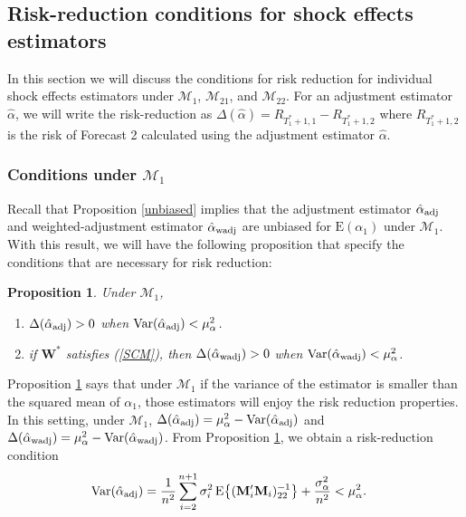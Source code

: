 \documentclass[11pt,3p,review,authoryear]{elsarticle}
\def\mbf#1{\mathbf{#1}} %
\def\mrm#1{\mathrm{#1}} %
\def\mc#1{\mathcal{#1}} %
\def\E#1{\mathrm{E}(#1)} %
\def\var#1{\mathrm{Var}(#1)} %
\DeclareMathOperator{\Var}{Var} %
\newtheorem{prop}{Proposition}
\theoremstyle{definition}
\begin{document}
\subsection{Risk-reduction conditions for shock effects estimators}
\label{conditions}

In this section we will discuss the conditions for risk reduction for individual shock effects estimators under $\mc{M}_1$, $\mc{M}_{21}$, and $\mc{M}_{22}$. For an adjustment estimator $\hat{\alpha}$, we will write the risk-reduction as $\Delta(\hat{\alpha})=R_{T_1^*+1,1}-R_{T_1^*+1,2}$ where $R_{T_1^*+1,2}$ is the risk of Forecast 2 calculated using the adjustment estimator $\hat{\alpha}$.

\subsubsection{Conditions under $\mc{M}_1$}
 \label{conditionsmodel1}
 
Recall that Proposition \ref{unbiased} implies that the adjustment estimator $\hat{\alpha}_{\rm adj}$ and weighted-adjustment estimator $\hat{\alpha}_{\rm wadj}$ are unbiased for $\E{\alpha_1}$ under $\mc{M}_1$. With this result, we will have  the following proposition that specify the conditions that are necessary for risk reduction:  

\begin{prop}
\label{proprisk}Under $\mc{M}_1$,
\begin{enumerate}[label = (\roman*)]
  \item $\Delta(\hat\alpha_{\rm adj}) > 0$  when 
$\Var(\hat{\alpha}_{\rm adj}) < \mu_{\alpha}^2$.
  \item if $\mbf{W}^*$ satisfies (\ref{SCM}), then $\Delta(\hat\alpha_{\rm wadj}) > 0$ when $\var{\hat{\alpha}_{\rm wadj}}<\mu_{\alpha}^2$. 
\end{enumerate}
\end{prop}


Proposition \ref{proprisk} says that under $\mc{M}_1$ if the variance of the estimator is smaller than the squared mean of $\alpha_1$, those estimators will enjoy the risk reduction properties.   In this setting, under $\mc{M}_1$, $\Delta(\hat{\alpha}_{\rm adj})= \mu_{\alpha}^2-\var{\hat{\alpha}_{\rm adj}}$ and $\Delta(\hat{\alpha}_{\rm wadj})= \mu_{\alpha}^2-\var{\hat{\alpha}_{\rm wadj}}$. 
From Proposition \ref{proprisk}, we obtain a risk-reduction condition
\begin{align}
  \var{\hat{\alpha}_{\rm adj}} 
  &=\frac{1}{n^2}\sum_{i=2}^{n+1}\sigma_i^2\, \mrm{E}\big\{(\mbf{M}'_i\mbf{M}_i)^{-1}_{22}\big\}+\frac{\sigma^2_{\alpha}}{n^2} < \mu_{\alpha}^2. \label{riskconditionadj}
\end{align}
\end{document}
